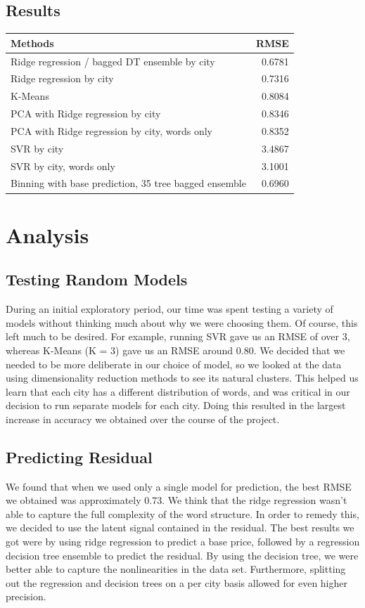 \documentclass[11pt]{article}
\begin{document}
\subsection*{Results}
\begin{center}
\begin{tabular}{| l || r |}
\hline
\textbf{Methods}									&	\textbf{RMSE}   \\ \hline \hline
Ridge regression / bagged DT ensemble by city  	&	0.6781 \\ \hline
Ridge regression by city							&	0.7316 \\ \hline
K-Means  											&	0.8084 \\ \hline
PCA with Ridge regression by city  					&	0.8346 \\ \hline
PCA with Ridge regression by city, words only  		&	0.8352 \\ \hline
SVR by city 										&	3.4867 \\ \hline
SVR by city, words only							&	3.1001 \\ \hline
Binning with base prediction, 35 tree bagged ensemble			&	0.6960 \\ \hline
\end{tabular}
\end{center}
\section{Analysis}

\subsection{Testing Random Models}
During an initial exploratory period, our time was spent testing a variety of models without thinking much about why we were choosing them. Of course, this left much to be desired. For example, running SVR gave us an RMSE of over 3, whereas K-Means (K = 3) gave us an RMSE around 0.80. We decided that we needed to be more deliberate in our choice of model, so we looked at the data using dimensionality reduction methods to see its natural clusters. This helped us learn that each city has a different distribution of words, and was critical in our decision to run separate models for each city. Doing this resulted in the largest increase in accuracy we obtained over the course of the project.

\subsection{Predicting Residual}
We found that when we used only a single model for prediction, the best RMSE we obtained was approximately 0.73. We think that the ridge regression wasn't able to capture the full complexity of the word structure. In order to remedy this, we decided to use the latent signal contained in the residual. The best results we got were by using ridge regression to predict a base price, followed by a regression decision tree ensemble to predict the residual. By using the decision tree, we were better able to capture the nonlinearities in the data set. Furthermore, splitting out the regression and decision trees on a per city basis allowed for even higher precision.
\end{document}
